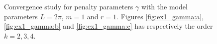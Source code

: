 \begin{figure}
    \caption{ Convergence study for penalty parameters $\gamma$ with the model parameters $L=2\pi$, $m=1$ and $r=1$. Figures \ref{fig:ex1_gamma:a}, \ref{fig:ex1_gamma:b} and \ref{fig:ex1_gamma:c} has respectively the order $k=2,3, 4$.  }
    \label{fig:ex2_gamma}
\end{figure}

